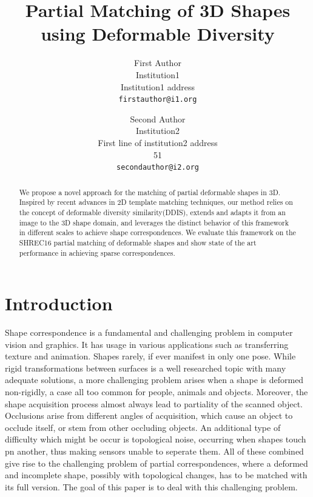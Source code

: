 \documentclass[10pt,twocolumn,letterpaper]{article}
\begin{document}
\title{Partial Matching of 3D Shapes using Deformable Diversity}

\author{First Author\\
Institution1\\
Institution1 address\\
{\tt\small firstauthor@i1.org}
\and
Second Author\\
Institution2\\
First line of institution2 address\\
51

{\tt\small secondauthor@i2.org}
}

\maketitle

\begin{abstract}
We propose a novel approach for the matching of partial deformable shapes in 3D. Inspired by recent advances in 2D template matching techniques, our method relies on the concept of deformable diversity similarity(DDIS), extends and adapts it from an image to the 3D shape domain, and leverages the distinct behavior of this framework in different scales to achieve shape correspondences. We evaluate this framework on the SHREC16 partial matching of deformable shapes and show state of the art performance in achieving sparse correspondences.
\end{abstract}

\section{Introduction}

Shape correspondence is a fundamental and challenging problem in computer vision and graphics. It has usage in various applications such as transferring texture and animation. 
Shapes rarely, if ever manifest in only one pose. While rigid transformations between surfaces is a well researched topic with many adequate solutions, a more challenging problem arises when a shape is deformed non-rigidly, a case all too common for people, animals and objects.
Moreover, the shape acquisition process almost always lead to partiality of the scanned object. Occlusions arise from different angles of acquisition, which cause an object to occlude itself, or stem from other occluding objects. 
An additional type of difficulty which might be occur is topological noise, occurring when shapes touch pn another, thus making  sensors unable to seperate them.
All of these combined give rise to the challenging problem of partial correspondences, where a deformed and incomplete shape, possibly with topological changes, has to be matched with its full version. The goal of this paper is to deal with this challenging problem.
\end{document}
